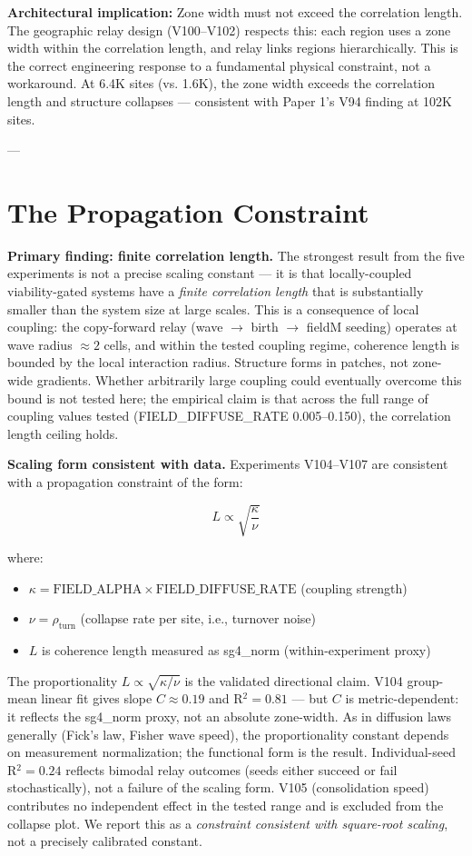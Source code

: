\documentclass[11pt]{article}
\begin{document}
\textbf{Architectural implication:} Zone width must not exceed the correlation length. The geographic relay design (V100--V102) respects this: each region uses a zone width within the correlation length, and relay links regions hierarchically. This is the correct engineering response to a fundamental physical constraint, not a workaround. At 6.4K sites (vs. 1.6K), the zone width exceeds the correlation length and structure collapses --- consistent with Paper 1's V94 finding at 102K sites.

---

\section{The Propagation Constraint}
\label{sec:law}

\textbf{Primary finding: finite correlation length.}
The strongest result from the five experiments is not a precise scaling constant --- it is that locally-coupled viability-gated systems have a \emph{finite correlation length} that is substantially smaller than the system size at large scales. This is a consequence of local coupling: the copy-forward relay (wave $\to$ birth $\to$ fieldM seeding) operates at wave radius $\approx 2$ cells, and within the tested coupling regime, coherence length is bounded by the local interaction radius. Structure forms in patches, not zone-wide gradients. Whether arbitrarily large coupling could eventually overcome this bound is not tested here; the empirical claim is that across the full range of coupling values tested (FIELD\_DIFFUSE\_RATE 0.005--0.150), the correlation length ceiling holds.

\textbf{Scaling form consistent with data.}
Experiments V104--V107 are consistent with a propagation constraint of the form:

\[
  L \propto \sqrt{\frac{\kappa}{\nu}}
\]

where:
\begin{itemize}
  \item $\kappa = \text{FIELD\_ALPHA} \times \text{FIELD\_DIFFUSE\_RATE}$ (coupling strength)
  \item $\nu = \rho_{\text{turn}}$ (collapse rate per site, i.e., turnover noise)
  \item $L$ is coherence length measured as sg4\_norm (within-experiment proxy)
\end{itemize}

The proportionality $L \propto \sqrt{\kappa/\nu}$ is the validated directional claim. V104 group-mean linear fit gives slope $C \approx 0.19$ and R$^2 = 0.81$ --- but $C$ is metric-dependent: it reflects the sg4\_norm proxy, not an absolute zone-width. As in diffusion laws generally (Fick's law, Fisher wave speed), the proportionality constant depends on measurement normalization; the functional form is the result. Individual-seed R$^2 = 0.24$ reflects bimodal relay outcomes (seeds either succeed or fail stochastically), not a failure of the scaling form. V105 (consolidation speed) contributes no independent effect in the tested range and is excluded from the collapse plot. We report this as a \emph{constraint consistent with square-root scaling}, not a precisely calibrated constant.
\end{document}
